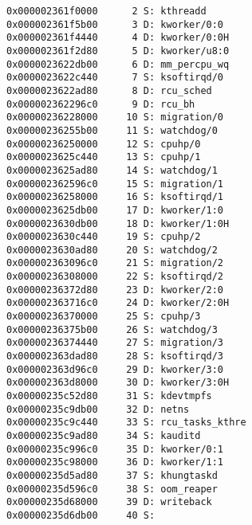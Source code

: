 \begin{itembox}[l]{2}
    \begin{verbatim}
0x000002361f0000      2 S: kthreadd
0x000002361f5b00      3 D: kworker/0:0
0x000002361f4440      4 D: kworker/0:0H
0x000002361f2d80      5 D: kworker/u8:0
0x0000023622db00      6 D: mm_percpu_wq
0x0000023622c440      7 S: ksoftirqd/0
0x0000023622ad80      8 D: rcu_sched
0x000002362296c0      9 D: rcu_bh
0x00000236228000     10 S: migration/0
0x00000236255b00     11 S: watchdog/0
0x00000236250000     12 S: cpuhp/0
0x0000023625c440     13 S: cpuhp/1
0x0000023625ad80     14 S: watchdog/1
0x000002362596c0     15 S: migration/1
0x00000236258000     16 S: ksoftirqd/1
0x0000023625db00     17 D: kworker/1:0
0x0000023630db00     18 D: kworker/1:0H
0x0000023630c440     19 S: cpuhp/2
0x0000023630ad80     20 S: watchdog/2
0x000002363096c0     21 S: migration/2
0x00000236308000     22 S: ksoftirqd/2
0x00000236372d80     23 D: kworker/2:0
0x000002363716c0     24 D: kworker/2:0H
0x00000236370000     25 S: cpuhp/3
0x00000236375b00     26 S: watchdog/3
0x00000236374440     27 S: migration/3
0x000002363dad80     28 S: ksoftirqd/3
0x000002363d96c0     29 D: kworker/3:0
0x000002363d8000     30 D: kworker/3:0H
0x00000235c52d80     31 S: kdevtmpfs
0x00000235c9db00     32 D: netns
0x00000235c9c440     33 S: rcu_tasks_kthre
0x00000235c9ad80     34 S: kauditd
0x00000235c996c0     35 D: kworker/0:1
0x00000235c98000     36 D: kworker/1:1
0x00000235d5ad80     37 S: khungtaskd
0x00000235d596c0     38 S: oom_reaper
0x00000235d68000     39 D: writeback
0x00000235d6db00     40 S:
    \end{verbatim}
\end{itembox}

